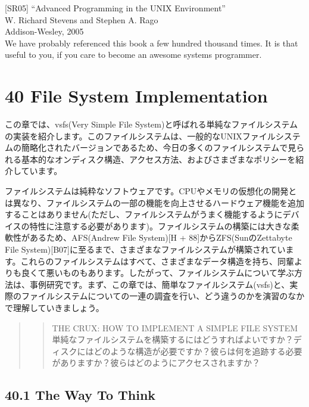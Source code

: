 {[}SR05{]} ``Advanced Programming in the UNIX Environment''\\
W. Richard Stevens and Stephen A. Rago\\
Addison-Wesley, 2005\\
We have probably referenced this book a few hundred thousand times. It
is that useful to you, if you care to become an awesome systems
programmer.

\newpage

\hypertarget{file-system-implementation}{%
\section*{40 File System
Implementation}\label{file-system-implementation}}

この章では、vsfs(Very Simple File
System)と呼ばれる単純なファイルシステムの実装を紹介します。このファイルシステムは、一般的なUNIXファイルシステムの簡略化されたバージョンであるため、今日の多くのファイルシステムで見られる基本的なオンディスク構造、アクセス方法、およびさまざまなポリシーを紹介しています。

ファイルシステムは純粋なソフトウェアです。CPUやメモリの仮想化の開発とは異なり、ファイルシステムの一部の機能を向上させるハードウェア機能を追加することはありません(ただし、ファイルシステムがうまく機能するようにデバイスの特性に注意する必要があります)。ファイルシステムの構築には大きな柔軟性があるため、AFS(Andrew
File System){[}H + 88{]}からZFS(SunのZettabyte File
System){[}B07{]}に至るまで、さまざまなファイルシステムが構築されています。これらのファイルシステムはすべて、さまざまなデータ構造を持ち、同輩よりも良くて悪いものもあります。したがって、ファイルシステムについて学ぶ方法は、事例研究です。まず、この章では、簡単なファイルシステム(vsfs)と、実際のファイルシステムについての一連の調査を行い、どう違うのかを演習のなかで理解していきましょう。

\begin{quote}
\begin{quote}
THE CRUX: HOW TO IMPLEMENT A SIMPLE FILE SYSTEM\\
単純なファイルシステムを構築するにはどうすればよいですか？ディスクにはどのような構造が必要ですか？彼らは何を追跡する必要がありますか？彼らはどのようにアクセスされますか？
\end{quote}
\end{quote}

\hypertarget{the-way-to-think}{%
\subsection*{40.1 The Way To Think}\label{the-way-to-think}}

